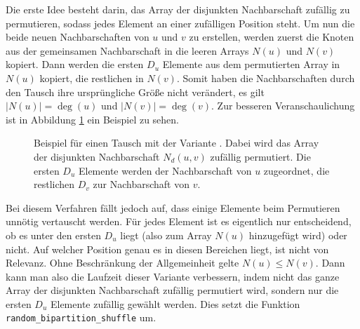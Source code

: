 Die erste Idee besteht darin,  
das Array der disjunkten Nachbarschaft zufällig zu permutieren, sodass jedes Element an 
einer zufälligen Position steht. Um nun die beide \glqq neuen\grqq{} Nachbarschaften von $u$ und $v$ zu erstellen,
werden zuerst die Knoten aus der gemeinsamen Nachbarschaft in die leeren Arrays $N(u)$ und $N(v)$ kopiert.
Dann werden die ersten $D_{u}$ Elemente aus dem permutierten Array in $N(u)$ kopiert, die restlichen
in $N(v)$. Somit haben die Nachbarschaften durch den Tausch ihre ursprüngliche Größe nicht verändert, es gilt $|N(u)| = \deg(u)$ und
$|N(v)| = \deg(v)$.
Zur besseren Veranschaulichung ist in Abbildung \ref{fig:trade_shuffle} ein Beispiel zu sehen.
\begin{figure}
\centering
  \caption{Beispiel für einen Tausch mit der Variante \perm. Dabei wird das Array der 
  disjunkten Nachbarschaft $N_{d}(u,v)$ zufällig permutiert. Die ersten $D_{u}$ Elemente werden der Nachbarschaft
  von $u$ zugeordnet, die restlichen $D_{v}$ zur Nachbarschaft von $v$. }
  \label{fig:trade_shuffle}
\end{figure}
Bei diesem Verfahren fällt  jedoch auf, dass einige Elemente beim Permutieren unnötig vertauscht werden.
Für jedes Element ist es eigentlich nur entscheidend, ob es unter den ersten $D_{u}$  liegt (also zum Array
$N(u)$ hinzugefügt wird) oder nicht. Auf welcher Position genau es in 
diesen Bereichen liegt, ist nicht von Relevanz. Ohne Beschränkung der Allgemeinheit gelte 
$N(u) \le N(v)$. Dann kann man
also die Laufzeit dieser Variante verbessern, indem nicht das ganze Array der disjunkten Nachbarschaft zufällig permutiert 
wird, sondern nur die ersten $D_{u}$  Elemente zufällig gewählt werden.
 Dies setzt die Funktion 
\texttt{random\_bipartition\_shuffle} um.
\\
\newpage{}

